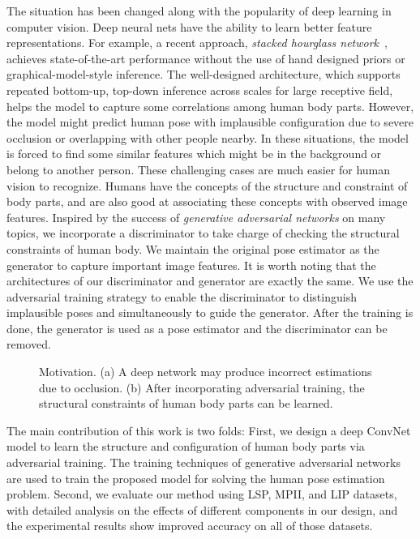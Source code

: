 \documentclass[10pt,twocolumn,letterpaper]{article}
\begin{document}
The situation has been changed along with the popularity of deep learning in computer vision. Deep neural nets have the ability to learn better feature representations. For example, a recent approach, {\em stacked hourglass network}~\cite{NewellYD16}, achieves state-of-the-art performance without the use of hand designed priors or graphical-model-style inference. The well-designed architecture, which supports repeated bottom-up, top-down inference across scales for large receptive field, helps the model to capture some correlations among human body parts. However, the model might predict human pose with implausible configuration due to severe occlusion or overlapping with other people nearby. In these situations, the model is forced to find some similar features which might be in the background or belong to another person. 
These challenging cases are much easier for human vision to recognize. Humans have the concepts of the structure and constraint of body parts, and are also good at associating these concepts with observed image features. Inspired by the success of {\em generative adversarial networks} on many topics, we incorporate a discriminator to take charge of checking the structural constraints of human body. We maintain the original pose estimator as the generator to capture important image features. It is worth noting that the architectures of our discriminator and generator are exactly the same. We use the adversarial training strategy to enable the discriminator to distinguish implausible poses and simultaneously to guide the generator. After the training is done, the generator is used as a pose estimator and the discriminator can be removed.

\begin{figure}[t]
\centering
    \caption{\label{fig:motiv} Motivation. (a) A deep network may produce incorrect estimations due to occlusion. (b) After incorporating adversarial training, the structural constraints of human body parts can be learned.}
 \end{figure}

The main contribution of this work is two folds: First, we design a deep ConvNet model to learn the structure and configuration of human body parts via adversarial training. The training techniques of generative adversarial networks are used to train the proposed model for solving the human pose estimation problem. Second, we evaluate our method using LSP, MPII, and LIP datasets, with detailed analysis on the effects of different components in our design, and the experimental results show improved accuracy on all of those datasets.
\end{document}
